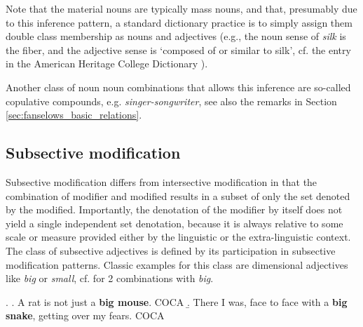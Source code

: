 Note that the material nouns are typically mass nouns, and that,
presumably due to this inference pattern, a standard dictionary
practice is to simply assign them double class membership as nouns and
adjectives (e.g., the noun sense of \emph{silk} is the fiber, and the
adjective sense is `composed of or similar to silk', cf. the
entry in the American Heritage College Dictionary \citeyear{AmericanHeritageDictionary3rd}). 

Another class of noun noun combinations that allows this inference are
so-called copulative compounds, e.g. \emph{singer-songwriter}, see
also the remarks in Section \ref{sec:fanselows_basic_relations}.

\subsection{Subsective modification}
\label{sec:subsective_adjectives}
Subsective modification differs from intersective modification in that
the combination of modifier and modified results in a subset of only the
set denoted by the modified. Importantly, the denotation of
the modifier by itself does not yield a single independent set
denotation, because it is always relative to some scale or measure provided
either by the linguistic or the extra-linguistic context. The class of
subsective adjectives is defined by its participation in subsective
modification patterns.
Classic examples for this class are
dimensional adjectives like \emph{big} or \emph{small}, cf. \Next for
2 combinations with \emph{big}.

\ex. \label{ex:big_mouse}
\a. A rat is not just a \textbf{big mouse}. COCA
\b.  \label{ex:big_snake}
There I was, face to face with a \textbf{big snake}, getting over my fears. COCA

